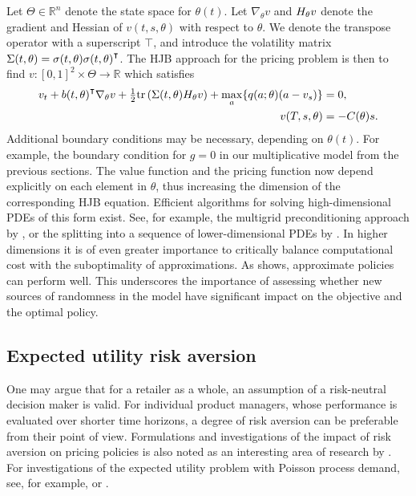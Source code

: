 \documentclass[main.tex]{subfiles}
\begin{document}
Let $\Theta\in\mathbb{R}^n$ denote the state space for
$\theta(t)$.
Let $\nabla_\theta v$ and $H_\theta v$ denote the gradient and Hessian of
$v(t,s,\theta)$ with respect to $\theta$. We denote the transpose
operator with a superscript $\intercal$, and introduce the
volatility matrix $\Sigma(t,\theta) =
\sigma(t,\theta){\sigma(t,\theta)}^\intercal$.
The HJB approach for the pricing problem is then to find
$v:{[0,1]}^2\times\Theta\to\mathbb{R}$ which satisfies
\begin{align}
  v_t+{b(t,\theta)}^\intercal \nabla_\theta v
  + {\textstyle\frac{1}{2}}\mbox{tr}\left( \Sigma(t,\theta)
  H_\theta v \right)
  +\max_{a}\{q(a;\theta)(a-v_s)\}&=0,\\
  v(T,s,\theta) &= -C(\theta)s.
\end{align}
Additional boundary conditions may be necessary, depending on
$\theta(t)$. For example, the boundary condition for $g=0$ in our
multiplicative model from the previous sections.
The value function and the pricing function now depend
explicitly on each element in $\theta$, thus increasing the dimension
of the corresponding HJB equation. Efficient algorithms for solving
high-dimensional PDEs of this form exist. See, for example, the
multigrid preconditioning approach by \citet{reisinger2017boundary}, or
the splitting into a sequence of lower-dimensional PDEs by \citet{reisinger2017finite}.
In higher dimensions it is of even greater importance to critically
balance computational cost with the suboptimality of
approximations. As  shows, approximate
policies can perform well. This underscores the importance of assessing whether
new sources of randomness in the model have significant impact on the
objective and the optimal policy.


\subsection{Expected utility risk aversion}
One may argue that for a retailer as a whole, an assumption of a
risk-neutral decision maker is valid. For individual product managers,
whose performance is evaluated over shorter time horizons, a degree of
risk aversion can be preferable from their point of view. Formulations and investigations of the
impact of risk aversion on pricing policies is also noted as an
interesting area of research by \citet{bitran2003overview}.
For investigations of the expected utility problem with Poisson process
demand, see, for example, \citet{lim2007relative} or \citet{feng2008risk}.
\end{document}
